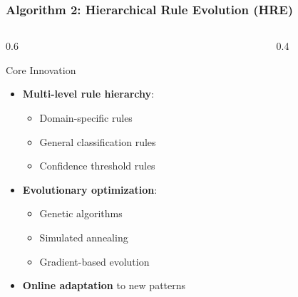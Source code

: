 \documentclass{beamer}
\begin{document}
\begin{frame}
\frametitle{Algorithm 2: Hierarchical Rule Evolution (HRE)}
\begin{columns}
\begin{column}{0.6\textwidth}
\begin{block}{Core Innovation}
\begin{itemize}
\item \textbf{Multi-level rule hierarchy}:
    \begin{itemize}
    \item Domain-specific rules
    \item General classification rules
    \item Confidence threshold rules
    \end{itemize}
\item \textbf{Evolutionary optimization}:
    \begin{itemize}
    \item Genetic algorithms
    \item Simulated annealing
    \item Gradient-based evolution
    \end{itemize}
\item \textbf{Online adaptation} to new patterns
\end{itemize}
\end{block}
\end{column}
\begin{column}{0.4\textwidth}
\begin{center}
\end{center}
\end{column}
\end{columns}
\end{frame}
\end{document}
